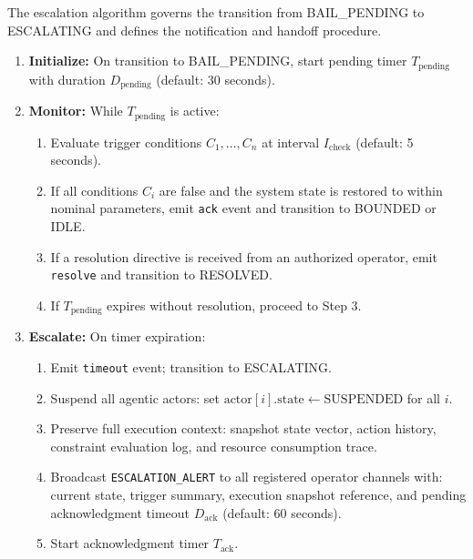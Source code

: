 The escalation algorithm governs the transition from BAIL\_PENDING to ESCALATING and defines the notification and handoff procedure.

\begin{algorithm}
\caption{Bailout Escalation Algorithm}
\label{alg:escalation}
\begin{enumerate}
    \item \textbf{Initialize:} On transition to BAIL\_PENDING, start pending timer $T_{\text{pending}}$ with duration $D_{\text{pending}}$ (default: 30 seconds).
    
    \item \textbf{Monitor:} While $T_{\text{pending}}$ is active:
    \begin{enumerate}
        \item Evaluate trigger conditions $C_1, \ldots, C_n$ at interval $I_{\text{check}}$ (default: 5 seconds).
        \item If all conditions $C_i$ are false and the system state is restored to within nominal parameters, emit \texttt{ack} event and transition to BOUNDED or IDLE.
        \item If a resolution directive is received from an authorized operator, emit \texttt{resolve} and transition to RESOLVED.
        \item If $T_{\text{pending}}$ expires without resolution, proceed to Step 3.
    \end{enumerate}
    
    \item \textbf{Escalate:} On timer expiration:
    \begin{enumerate}
        \item Emit \texttt{timeout} event; transition to ESCALATING.
        \item Suspend all agentic actors: set $\text{actor}[i].\text{state} \leftarrow \text{SUSPENDED}$ for all $i$.
        \item Preserve full execution context: snapshot state vector, action history, constraint evaluation log, and resource consumption trace.
        \item Broadcast \texttt{ESCALATION\_ALERT} to all registered operator channels with: current state, trigger summary, execution snapshot reference, and pending acknowledgment timeout $D_{\text{ack}}$ (default: 60 seconds).
        \item Start acknowledgment timer $T_{\text{ack}}$.
    \end{enumerate}
    

\end{enumerate}
\end{algorithm}
